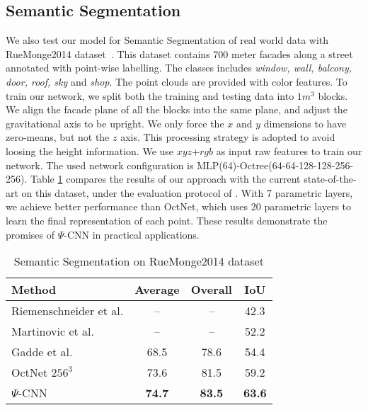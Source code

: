 \documentclass[10pt,twocolumn,letterpaper]{article}
\begin{document}
{\subsection{Semantic Segmentation}
\vspace{-2mm}
We also test our model for Semantic Segmentation of real world data with RueMonge2014 dataset~\cite{riemenschneider2014learning}.
This dataset contains 700 meter facades along a street annotated with point-wise labelling. The classes includes \emph{window, wall, balcony, door, roof, sky} and \emph{shop}. The point clouds are provided with color features. To train our network, we split both the training and testing data into $1m^3$ blocks. We align the facade plane of all the blocks into the same plane, and adjust the gravitational axis to be upright. We only force the $x$ and $y$ dimensions to have zero-means, but not the $z$ axis. This processing strategy is adopted to avoid loosing the height information. 
We use $xyz$+$rgb$ as input raw features to train our network. The used network configuration is MLP(64)-Octree(64-64-128-128-256-256). Table \ref{ruemonge2014_seg} compares the results of our approach with 
the current state-of-the-art on this dataset, 
under the evaluation protocol of \cite{gadde2018efficient}. With 7 parametric layers, we achieve better performance than OctNet,
which uses 20 parametric layers to learn the final representation of each point. These results demonstrate the promises of $\Psi$-CNN in practical applications. 

\begin{table}
\caption{Semantic Segmentation on RueMonge2014 dataset}\label{ruemonge2014_seg}
\begin{tabular}{l|c|c|c}
  \hline
 Method& Average & Overall & IoU \\
  \hline
Riemenschneider et al. \cite{riemenschneider2014learning} & -- & -- & 42.3 \\
Martinovic et al. \cite{martinovic20153d} & -- & -- & 52.2 \\
Gadde et al. \cite{gadde2018efficient} & 68.5 &78.6 &54.4 \\
OctNet $256^3$ \cite{riegler2017octnet} & 73.6 & 81.5 & 59.2 \\
\hline
$\Psi$-CNN & \textbf{74.7} & \textbf{83.5} & \textbf{63.6} \\
  \hline
\end{tabular}\
\end{table}

}
\end{document}
